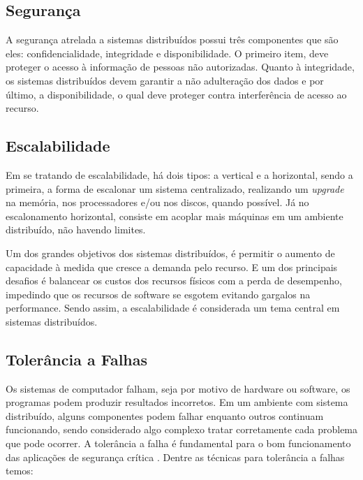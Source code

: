 \documentclass[
	12pt,				%
	oneside,			%
	a4paper,			%
	english,			%
	brazil				%
	]{abntex2ppgsi}
\begin{document}
\subsection{Segurança}

A segurança atrelada a sistemas distribuídos possui três componentes que são eles: confidencialidade, integridade e disponibilidade. O primeiro item, deve proteger o acesso à informação de pessoas não autorizadas. Quanto à integridade, os sistemas distribuídos devem garantir a não adulteração dos dados e por último, a disponibilidade, o qual deve proteger contra interferência de acesso ao recurso.

\subsection{Escalabilidade}

Em se tratando de escalabilidade, há dois tipos: a vertical e a horizontal, sendo a primeira, a forma de escalonar um sistema centralizado, realizando um \textit{upgrade} na memória, nos processadores e/ou nos discos, quando possível. Já no escalonamento horizontal, consiste em acoplar mais máquinas em um ambiente distribuído, não havendo limites.

Um dos grandes objetivos dos sistemas distribuídos, é permitir o aumento de capacidade à medida que cresce a demanda pelo recurso. E um dos principais desafios é balancear os custos dos recursos físicos com a perda de desempenho, impedindo que os recursos de software se esgotem evitando gargalos na performance. Sendo assim, a escalabilidade é considerada um tema central em sistemas distribuídos.

\subsection{Tolerância a Falhas}

Os sistemas de computador falham, seja por motivo de hardware ou software, os programas podem produzir resultados incorretos. Em um ambiente com sistema distribuído, alguns componentes podem falhar enquanto outros continuam funcionando, sendo considerado algo complexo tratar corretamente cada problema que pode ocorrer. A tolerância a falha é fundamental para o bom funcionamento das aplicações de segurança crítica \cite{gorender2002modelo} . Dentre as técnicas para tolerância a falhas temos: 
\end{document}
